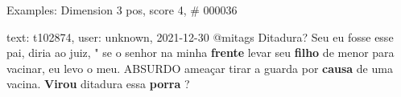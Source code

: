 \begin{frame}{Examples: Dimension 3 pos, score 4, \# 000036}
\footnotesize
\begin{exampleblock}{text: t102874, user: unknown, 2021-12-30}
@mitags Ditadura? Seu eu fosse esse pai, diria ao juiz, " se o senhor na minha 
\textbf{frente} levar seu \textbf{filho} de menor para vacinar, eu levo o meu. 
ABSURDO ameaçar tirar a guarda por \textbf{causa} de uma vacina. \textbf{Virou} 
ditadura essa \textbf{porra} ? 
\end{exampleblock}
\end{frame}

